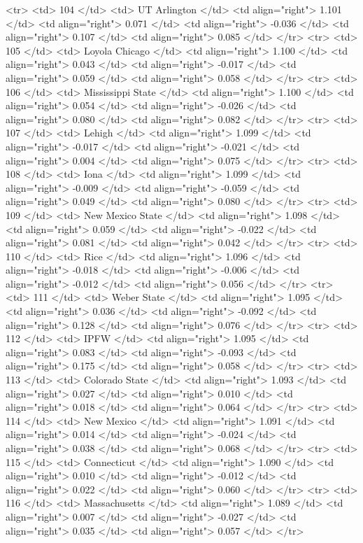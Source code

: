   <tr> <td> 104 </td> <td> UT Arlington </td> <td align="right"> 1.101 </td> <td align="right"> 0.071 </td> <td align="right"> -0.036 </td> <td align="right"> 0.107 </td> <td align="right"> 0.085 </td> </tr>
  <tr> <td> 105 </td> <td> Loyola Chicago </td> <td align="right"> 1.100 </td> <td align="right"> 0.043 </td> <td align="right"> -0.017 </td> <td align="right"> 0.059 </td> <td align="right"> 0.058 </td> </tr>
  <tr> <td> 106 </td> <td> Mississippi State </td> <td align="right"> 1.100 </td> <td align="right"> 0.054 </td> <td align="right"> -0.026 </td> <td align="right"> 0.080 </td> <td align="right"> 0.082 </td> </tr>
  <tr> <td> 107 </td> <td> Lehigh </td> <td align="right"> 1.099 </td> <td align="right"> -0.017 </td> <td align="right"> -0.021 </td> <td align="right"> 0.004 </td> <td align="right"> 0.075 </td> </tr>
  <tr> <td> 108 </td> <td> Iona </td> <td align="right"> 1.099 </td> <td align="right"> -0.009 </td> <td align="right"> -0.059 </td> <td align="right"> 0.049 </td> <td align="right"> 0.080 </td> </tr>
  <tr> <td> 109 </td> <td> New Mexico State </td> <td align="right"> 1.098 </td> <td align="right"> 0.059 </td> <td align="right"> -0.022 </td> <td align="right"> 0.081 </td> <td align="right"> 0.042 </td> </tr>
  <tr> <td> 110 </td> <td> Rice </td> <td align="right"> 1.096 </td> <td align="right"> -0.018 </td> <td align="right"> -0.006 </td> <td align="right"> -0.012 </td> <td align="right"> 0.056 </td> </tr>
  <tr> <td> 111 </td> <td> Weber State </td> <td align="right"> 1.095 </td> <td align="right"> 0.036 </td> <td align="right"> -0.092 </td> <td align="right"> 0.128 </td> <td align="right"> 0.076 </td> </tr>
  <tr> <td> 112 </td> <td> IPFW </td> <td align="right"> 1.095 </td> <td align="right"> 0.083 </td> <td align="right"> -0.093 </td> <td align="right"> 0.175 </td> <td align="right"> 0.058 </td> </tr>
  <tr> <td> 113 </td> <td> Colorado State </td> <td align="right"> 1.093 </td> <td align="right"> 0.027 </td> <td align="right"> 0.010 </td> <td align="right"> 0.018 </td> <td align="right"> 0.064 </td> </tr>
  <tr> <td> 114 </td> <td> New Mexico </td> <td align="right"> 1.091 </td> <td align="right"> 0.014 </td> <td align="right"> -0.024 </td> <td align="right"> 0.038 </td> <td align="right"> 0.068 </td> </tr>
  <tr> <td> 115 </td> <td> Connecticut </td> <td align="right"> 1.090 </td> <td align="right"> 0.010 </td> <td align="right"> -0.012 </td> <td align="right"> 0.022 </td> <td align="right"> 0.060 </td> </tr>
  <tr> <td> 116 </td> <td> Massachusetts </td> <td align="right"> 1.089 </td> <td align="right"> 0.007 </td> <td align="right"> -0.027 </td> <td align="right"> 0.035 </td> <td align="right"> 0.057 </td> </tr>
